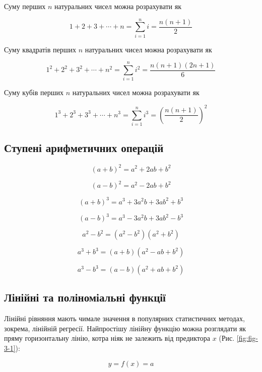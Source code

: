 \documentclass[
  11pt,
]{book}
\begin{document}
Суму перших \(n\) натуральних чисел можна розрахувати як

\[1+2+3+\cdots + n = \sum\limits_{i=1}^n i = \frac{n(n+1)}{2}\]

Суму квадратів перших \(n\) натуральних чисел можна розрахувати як

\[1^2+2^2+3^2+\cdots + n^2 = \sum\limits_{i=1}^n i^2 = \frac{n(n+1)(2n+1)}{6}\]

Суму кубів перших \(n\) натуральних чисел можна розрахувати як

\[1^3+2^3+3^3+\cdots + n^3 = \sum\limits_{i=1}^n i^3 = \left( \frac{n(n+1)}{2} \right)^2\]

\subsection{Ступені арифметичних операцій}\label{ux441ux442ux443ux43fux435ux43dux456-ux430ux440ux438ux444ux43cux435ux442ux438ux447ux43dux438ux445-ux43eux43fux435ux440ux430ux446ux456ux439}

\[(a+b)^2 = a^2 + 2ab + b^2\]

\[(a-b)^2 = a^2 - 2ab + b^2\]

\[(a+b)^3 = a^3 + 3a^2b + 3ab^2 + b^3\]

\[(a-b)^3 = a^3 - 3a^2b + 3ab^2 - b^3\]

\[a^2 - b^2 = (a^2 - b^2)(a^2 + b^2)\]

\[a^3 + b^3 = (a+b)(a^2 - ab + b^2)\]

\[a^3 - b^3 = (a-b)(a^2 + ab + b^2)\]

\subsection{Лінійні та поліноміальні функції}\label{ux43bux456ux43dux456ux439ux43dux456-ux442ux430-ux43fux43eux43bux456ux43dux43eux43cux456ux430ux43bux44cux43dux456-ux444ux443ux43dux43aux446ux456ux457}

Лінійні рівняння мають чимале значення в популярних статистичних методах, зокрема, лінійній регресії. Найпростішу лінійну функцію можна розглядати як пряму горизонтальну лінію, котра ніяк не залежить від предиктора \(x\) (Рис. \ref{fig:fig-3-1}):

\[y = f(x) = a\]
\end{document}
